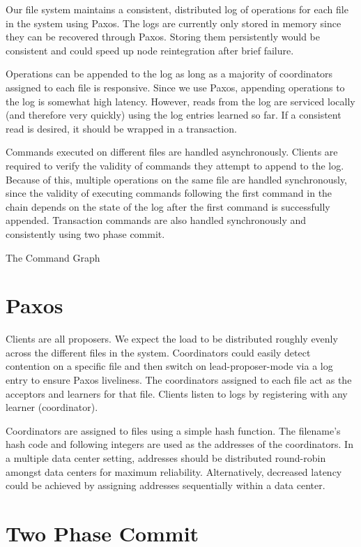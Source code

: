 \documentclass[11pt]{article}
\begin{document}
Our file system maintains a consistent, distributed log of operations for each file in the system using Paxos.
The logs are currently only stored in memory since they can be recovered through Paxos.
Storing them persistently would be consistent and could speed up node reintegration after brief failure.

Operations can be appended to the log as long as a majority of coordinators assigned to each file is responsive.
Since we use Paxos, appending operations to the log is somewhat high latency.
However, reads from the log are serviced locally (and therefore very quickly) using the log entries learned so far.
If a consistent read is desired, it should be wrapped in a transaction.

Commands executed on different files are handled asynchronously.
Clients are required to verify the validity of commands they attempt to append to the log. 
Because of this, multiple operations on the same file are handled synchronously, since the validity of executing commands
following the first command in the chain depends on the state of the log after the first command is successfully appended.
Transaction commands are also handled synchronously and consistently using two phase commit.

The Command Graph

\section{Paxos}

Clients are all proposers. We expect the load to be distributed roughly evenly across the different files in the system.
Coordinators could easily detect contention on a specific file and then switch on lead-proposer-mode via a log entry to ensure Paxos liveliness.
The coordinators assigned to each file act as the acceptors and learners for that file.
Clients listen to logs by registering with any learner (coordinator).

Coordinators are assigned to files using a simple hash function.
The filename's hash code and following integers are used as the addresses of the coordinators.
In a multiple data center setting, addresses should be distributed round-robin amongst data centers for maximum reliability.
Alternatively, decreased latency could be achieved by assigning addresses sequentially within a data center.

\section{Two Phase Commit}
\end{document}
